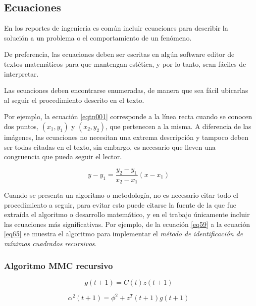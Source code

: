 \subsection{Ecuaciones}

En los reportes de ingeniería es común incluir ecuaciones para describir la solución a un problema o el comportamiento de un fenómeno.

De preferencia, las ecuaciones deben ser escritas en algún software editor de textos matemáticos para que mantengan estética, y por lo tanto, sean fáciles de interpretar.

Las ecuaciones deben encontrarse enumeradas, de manera que sea fácil ubicarlas al seguir el procedimiento descrito en el texto.

Por ejemplo, la ecuación \ref{eqtn001} corresponde a la línea recta cuando se conocen dos puntos, $(x_1,y_1)$ y $(x_2,y_2)$, que pertenecen a la misma. A diferencia de las imágenes, las ecuaciones no necesitan una extrema descripción y tampoco deben ser todas citadas en el texto, sin embargo, es necesario que lleven una congruencia que pueda seguir el lector.

\begin{equation}
y - y_1  = \frac{{y_2  - y_1 }}{{x_2  - x_1 }}\left( {x - x_1 } \right)
\label{eqtn001}
\end{equation}

Cuando se presenta un algoritmo o metodología, no es necesario citar todo el procedimiento a seguir, para evitar esto puede citarse la fuente de la que fue extraída el algoritmo o desarrollo matemático, y en el trabajo únicamente incluir las ecuaciones más significativas. Por ejemplo, de la ecuación \ref{eq59} a la ecuación \ref{eq65} se muestra el algoritmo para implementar el \emph{método de identificación de mínimos cuadrados recursivos}.

\subsubsection{Algoritmo MMC recursivo\\}

\begin{equation}
g(t + 1) = C(t)z(t + 1)
\label{eq59}
\end{equation}

\begin{equation}
\alpha ^2 (t + 1) = \phi ^2  + z^T (t + 1)g(t + 1)
\label{eq60}
\end{equation}

